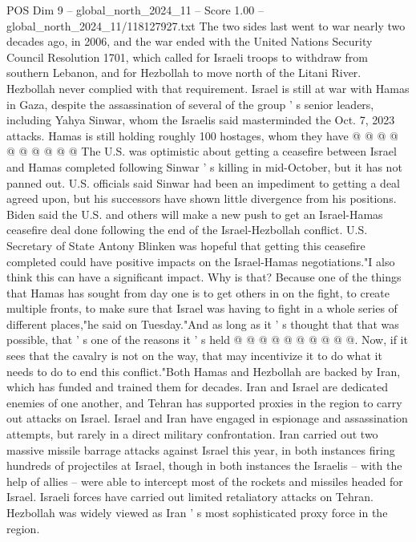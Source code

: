 \begin{textsample}{POS Dim 9 – global\_north\_2024\_11 – Score 1.00 – global\_north\_2024\_11/118127927.txt}
The two sides last went to war nearly two decades ago, in 2006, and the war ended with the United Nations Security Council Resolution 1701, which called for Israeli troops to withdraw from southern Lebanon, and for Hezbollah to move north of the Litani River.
Hezbollah never complied with that requirement.
Israel is still at war with Hamas in Gaza, despite the assassination of several of the group ' s senior leaders, including Yahya Sinwar, whom the Israelis said masterminded the Oct. 7, 2023 attacks.
Hamas is still holding roughly 100 hostages, whom they have @ @ @ @ @ @ @ @ @ @ The U.S. was optimistic about getting a ceasefire between Israel and Hamas completed following Sinwar ' s killing in mid-October, but it has not panned out.
U.S. officials said Sinwar had been an impediment to getting a deal agreed upon, but his successors have shown little divergence from his positions.
Biden said the U.S. and others will make a new push to get an Israel-Hamas ceasefire deal done following the end of the Israel-Hezbollah conflict.
U.S.
Secretary of State Antony Blinken was hopeful that getting this ceasefire completed could have positive impacts on the Israel-Hamas negotiations."I also think this can have a significant impact.
Why is that?
Because one of the things that Hamas has sought from day one is to get others in on the fight, to create multiple fronts, to make sure that Israel was having to fight in a whole series of different places,"he said on Tuesday."And as long as it ' s thought that that was possible, that ' s one of the reasons it ' s held @ @ @ @ @ @ @ @ @ @.
Now, if it sees that the cavalry is not on the way, that may incentivize it to do what it needs to do to end this conflict."Both Hamas and Hezbollah are backed by Iran, which has funded and trained them for decades.
Iran and Israel are dedicated enemies of one another, and Tehran has supported proxies in the region to carry out attacks on Israel.
Israel and Iran have engaged in espionage and assassination attempts, but rarely in a direct military confrontation.
Iran carried out two massive missile barrage attacks against Israel this year, in both instances firing hundreds of projectiles at Israel, though in both instances the Israelis -- with the help of allies -- were able to intercept most of the rockets and missiles headed for Israel.
Israeli forces have carried out limited retaliatory attacks on Tehran.
Hezbollah was widely viewed as Iran ' s most sophisticated proxy force in the region.

\end{textsample}
